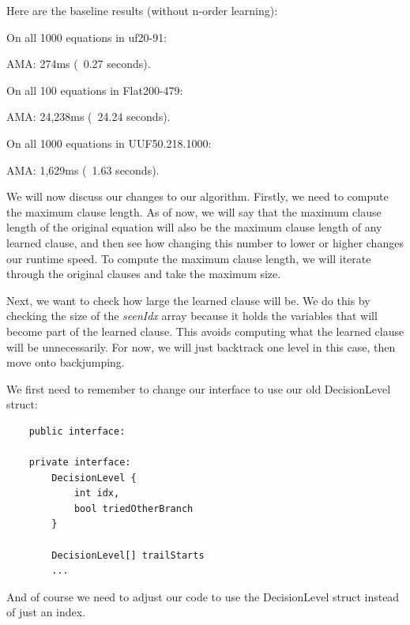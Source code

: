 \documentclass[../main.tex]{subfiles}
\begin{document}
Here are the baseline results (without n-order learning):
\begin{FVerbatim}
On all 1000 equations in uf20-91:

AMA:     274ms (~0.27 seconds).

On all 100 equations in Flat200-479:

AMA:     24,238ms (~24.24 seconds).

On all 1000 equations in UUF50.218.1000:

AMA:     1,629ms (~1.63 seconds).
\end{FVerbatim}
\noindent
We will now discuss our changes to our algorithm. Firstly, we need to compute the 
maximum clause length. As of now, we will say that the maximum clause length of the 
original equation will also be the maximum clause length of any learned clause, and then 
see how changing this number to lower or higher changes our runtime speed. To compute 
the maximum clause length, we will iterate through the original clauses and take the 
maximum size.

Next, we want to check how large the learned clause will be. We do this by checking 
the size of the \textit{seenIdx} array because it holds the variables that will 
become part of the learned clause. This avoids computing what the learned clause will 
be unnecessarily. For now, we will just backtrack one level in this case, then move onto 
backjumping.

We first need to remember to change our interface to use our old DecisionLevel struct:
\begin{lstlisting}
    public interface:

    private interface:
        DecisionLevel {
            int idx,
            bool triedOtherBranch
        }

        DecisionLevel[] trailStarts
        ...
\end{lstlisting}
\noindent
And of course we need to adjust our code to use the DecisionLevel struct instead of just an index.
\end{document}
